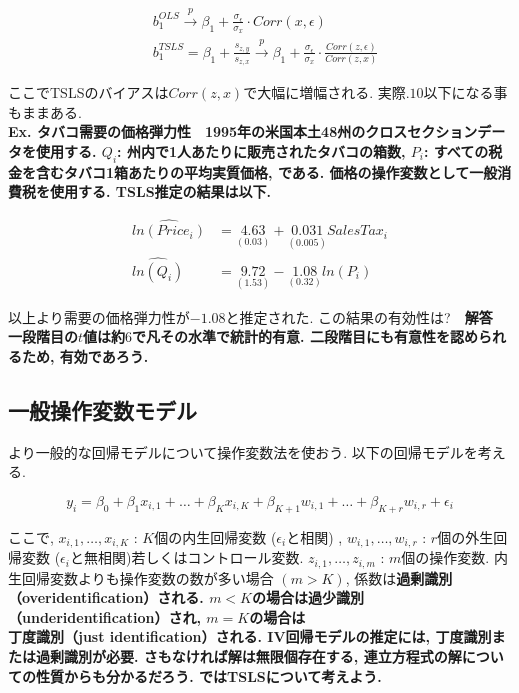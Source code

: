 \documentclass[paper=a4paper,fontsize=10pt]{jlreq}
\begin{document}
\begin{align*}
  &b_1^{OLS} \overset{p}{\to} \beta_1 + \frac{\sigma_{\epsilon}}{\sigma_{x}} \cdot Corr(x, \epsilon)\\
  &b_1^{TSLS} = \beta_1 + \frac{s_{z,y}}{s_{z,x}} \overset{p}{\to} \beta_1 + \frac{\sigma_{\epsilon}}{\sigma_{x}} \cdot \frac{Corr(z, \epsilon)}{Corr(z, x)}
\end{align*}

ここでTSLSのバイアスは$Corr(z, x)$で大幅に増幅される. 実際$.10$以下になる事もままある.\\

\rmfamily\mcfamily\bfseries{Ex. タバコ需要の価格弾力性}\mdseries　1995年の米国本土48州のクロスセクションデータを使用する. $Q_i$: 州内で1人あたりに販売されたタバコの箱数, $P_i$: すべての税金を含むタバコ1箱あたりの平均実質価格, である. 価格の操作変数として一般消費税を使用する. TSLS推定の結果は以下.

\begin{align*}
  \hat{ln(Price_i)} &= \underset{(0.03)}{4.63}  + \underset{(0.005)}{0.031}  SalesTax_i\\
  \hat{ln(Q_i)} &= \underset{(1.53)}{9.72} - \underset{(0.32)}{1.08}  ln(P_i)
\end{align*}

以上より需要の価格弾力性が$-1.08$と推定された. この結果の有効性は?　\rmfamily\mcfamily\bfseries{解答}\mdseries　一段階目の$t$値は約$6$で凡その水準で統計的有意. 二段階目にも有意性を認められるため, 有効であろう.\\

\subsection{一般操作変数モデル}
より一般的な回帰モデルについて操作変数法を使おう. 以下の回帰モデルを考える.

\begin{equation*}
  y_i = \beta_0 + \beta_1 x_{i,1} + \dots + \beta_K x_{i,K} + \beta_{K+1} w_{i,1} + \dots + \beta_{K+r} w_{i,r} + \epsilon_i
\end{equation*}

ここで, $x_{i,1}, \dots, x_{i,K}$ : $K$個の内生回帰変数 ($\epsilon_i$と相関) , $w_{i,1}, \dots, w_{i,r}$ : $r$個の外生回帰変数 ($\epsilon_i$と無相関)若しくはコントロール変数. $z_{i,1}, \dots, z_{i,m}$ : $m$個の操作変数. 内生回帰変数よりも操作変数の数が多い場合 $(m > K)$, 係数は\rmfamily\mcfamily\bfseries{過剰識別（overidentification）}\mdseries される. $m < K$の場合は\rmfamily\mcfamily\bfseries{過少識別（underidentification）}\mdseries され, $m = K$の場合は\rmfamily\mcfamily\bfseries{丁度識別（just identification）}\mdseries される. IV回帰モデルの推定には, \rmfamily\mcfamily\bfseries{丁度識別または過剰識別}\mdseries が必要. さもなければ解は無限個存在する, 連立方程式の解についての性質からも分かるだろう. ではTSLSについて考えよう.\\
\end{document}
